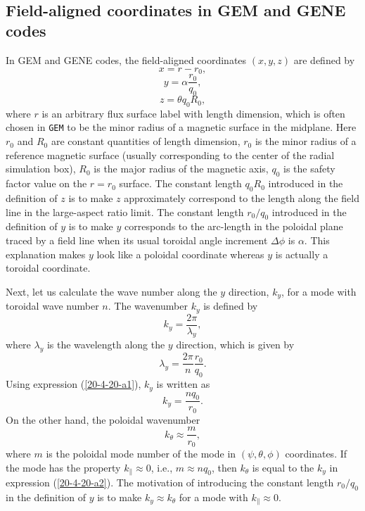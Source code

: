 \documentclass{article}
\newcommand{\code}[1]{\texttt{#1}}
\begin{document}
\

\subsection{Field-aligned coordinates in GEM{\cite{ychen2007}} and
GENE{\cite{gorler2016}} codes}

In GEM{\cite{ychen2007}} and GENE{\cite{gorler2016}} codes, the field-aligned
coordinates $(x, y, z)$ are defined by
\begin{equation}
  x = r - r_0,
\end{equation}
\begin{equation}
  y = \alpha \frac{r_0}{q_0},
\end{equation}
\begin{equation}
  z = \theta q_0 R_0,
\end{equation}
where $r$ is an arbitrary flux surface label with length dimension, which is
often chosen in {\code{GEM}} to be the minor radius of a magnetic surface in
the midplane. Here $r_0$ and $R_0$ are constant quantities of length
dimension, $r_0$ is the minor radius of a reference magnetic surface (usually
corresponding to the center of the radial simulation box), $R_0$ is the major
radius of the magnetic axis, $q_0$ is the safety factor value on the $r = r_0$
surface. The constant length $q_0 R_0$ introduced in the definition of $z$ is
to make $z$ approximately correspond to the length along the field line in the
large-aspect ratio limit. The constant length $r_0 / q_0$ introduced in the
definition of $y$ is to make $y$ corresponds to the arc-length in the poloidal
plane traced by a field line when its usual toroidal angle increment $\Delta
\phi$ is $\alpha$. This explanation makes $y$ look like a poloidal coordinate
whereas $y$ is actually a toroidal coordinate.

Next, let us calculate the wave number along the $y$ direction, $k_y$, for a
mode with toroidal wave number $n$. The wavenumber $k_y$ is defined by
\begin{equation}
  k_y = \frac{2 \pi}{\lambda_y},
\end{equation}
where $\lambda_y$ is the wavelength along the $y$ direction, which is given by
\begin{equation}
  \label{20-4-20-a1} \lambda_y = \frac{2 \pi}{n}  \frac{r_0}{q_0} .
\end{equation}
Using expression (\ref{20-4-20-a1}), $k_y$ is written as
\begin{equation}
  \label{20-4-20-a2} k_y = \frac{n q_0}{r_0} .
\end{equation}
On the other hand, the poloidal wavenumber
\begin{equation}
  k_{\theta} \approx \frac{m}{r_0},
\end{equation}
where $m$ is the poloidal mode number of the mode in $(\psi, \theta, \phi)$
coordinates. If the mode has the property $k_{\parallel} \approx 0$, i.e., $m
\approx n q_0$, then $k_{\theta}$ is equal to the $k_y$ in expression
(\ref{20-4-20-a2}). The motivation of introducing the constant length $r_0 /
q_0$ in the definition of $y$ is to make $k_y \approx k_{\theta}$ for a mode
with $k_{\parallel} \approx 0$.
\end{document}
